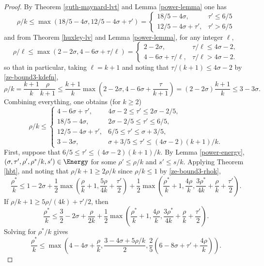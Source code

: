 \begin{proof}
By Theorem \ref{guth-maynard-lvt} and Lemma \ref{power-lemma} one has
\[
\rho/k \le \max(18/5 - 4\sigma, 12/5 - 4\sigma + \tau') = \begin{cases}
18/5 - 4\sigma,& \tau' \le 6/5\\
12/5 - 4\sigma + \tau',&\tau' > 6/5
\end{cases}
\]
and from Theorem \ref{huxley-lv} and Lemma \ref{power-lemma}, for any integer $\ell$,
\[
\rho/\ell \le \max(2 -2\sigma, 4 - 6\sigma + \tau/\ell) = \begin{cases}
2 - 2\sigma,&\tau/\ell \le 4\sigma - 2,\\
4 - 6\sigma + \tau/\ell,& \tau/\ell > 4\sigma - 2.
\end{cases}
\]
so that in particular, taking $\ell = k + 1$ and noting that $\tau/(k + 1) \le 4\sigma - 2$ by \eqref{ze-bound3-kdefn},
\[
\rho/k = \frac{k + 1}{k}\frac{\rho}{k + 1} \le \frac{k + 1}{k}\max(2 - 2\sigma, 4 - 6\sigma + \frac{\tau}{k + 1}) = (2 - 2\sigma)\frac{k + 1}{k} \le 3 - 3\sigma.
\]
Combining everything, one obtains (for $k \ge 2$)
\begin{equation}
\label{ze-bound3-rhok}
\rho/k \le \begin{cases}
4 - 6\sigma + \tau',& 4\sigma - 2 \le \tau' \le 2\sigma - 2/5,\\
18/5 - 4\sigma,& 2\sigma - 2/5 \le \tau' \le 6/5,\\
12/5 - 4\sigma + \tau', &6/5 \le \tau' \le \sigma + 3/5,\\
3 - 3\sigma,& \sigma + 3/5 \le \tau' \le (4\sigma - 2)(k + 1)/k.
\end{cases}
\end{equation}
First, suppose that $6/5 \le \tau' \le (4\sigma - 2)(k + 1)/k$. By Lemma \ref{power-energy}, $(\sigma, \tau', \rho', \rho^*/k, s') \in \Energy$ for some $\rho' \le \rho/k$ and $s' \le s/k$. Applying Theorem \ref{hbt}, and noting that $\rho/k + 1 \ge 2\rho/k$ since $\rho/k \le 1$ by \eqref{ze-bound3-rhok},
\[
\frac{\rho^*}{k} \le 1-2\sigma + \frac{1}{2}\max\left(\frac{\rho}{k}+1, \frac{5\rho}{4k} + \frac{\tau'}{2}\right) + \frac{1}{2}\max\left(\frac{\rho^*}{k}+1, \frac{4\rho}{k}, \frac{3\rho^*}{4k} +\frac{\rho}{k}+\frac{\tau'}{2}\right).
\]
If $\rho/k + 1 \ge 5\rho/(4k) + \tau'/2$, then
\[
\frac{\rho^*}{k} \le \frac{3}{2} - 2\sigma + \frac{\rho}{2k} + \frac{1}{2}\max\left(\frac{\rho^*}{k}+1, \frac{4\rho}{k}, \frac{3\rho^*}{4k} +\frac{\rho}{k}+\frac{\tau'}{2}\right).
\]
Solving for $\rho^*/k$ gives
\[
\frac{\rho^*}{k} \le \max\left(4 - 4\sigma + \frac{\rho}{k}, \frac{3 - 4\sigma + 5\rho/k}{2}, \frac{2}{5}(6 - 8\sigma + \tau' + \frac{4\rho}{k})\right).
\]
\end{proof}
